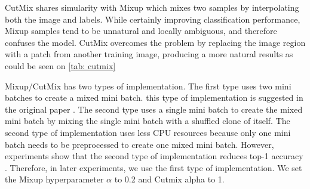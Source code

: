 CutMix shares simularity with Mixup which mixes two samples by interpolating both the image and labels. While certainly improving classification performance, Mixup samples tend to be unnatural and locally ambiguous, and therefore confuses the model. CutMix overcomes the problem by replacing the image region with a patch from another training image, producing a more natural results as could be seen on \ref{tab: cutmix}

Mixup/CutMix has two types of implementation. The first type uses two mini batches to create a mixed mini batch. this type of implementation is suggested in the original paper \cite{zhang2017_mixup}. The second type uses a single mini batch to create the mixed mini batch by mixing the single mini batch with a shuffled clone of itself. The second type of implementation uses less CPU resources because only one mini batch needs to be preprocessed to create one mixed mini batch. However, experiments show that the second type of implementation reduces top-1 accuracy \cite{lee2020_compounding_improvements}. Therefore, in later experiments, we use the first type of implementation. We set the Mixup hyperparameter $\alpha$ to 0.2 and Cutmix alpha to 1. 










